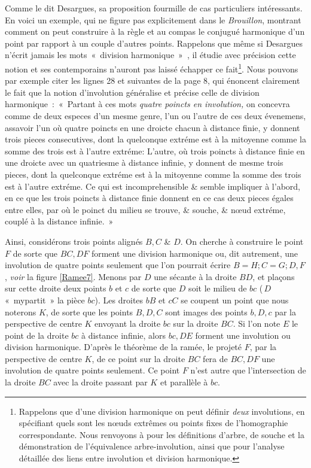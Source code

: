 \documentclass[12pt, a4paper]{article}
\begin{document}
Comme le dit Desargues, sa proposition fourmille de cas particuliers intéressants. En voici un exemple, qui ne figure pas explicitement dans le \textit{Brouillon}, montrant comment on peut construire à la règle et au compas le conjugué harmonique d'un point par rapport à un couple d'autres points. Rappelons que même si Desargues n'écrit jamais les mots~«~division harmonique~»~, il étudie avec précision cette notion et ses contemporains n'auront pas laissé échapper ce fait\footnote{Rappelons que d'une division harmonique on peut définir \textit{deux} involutions, en spécifiant quels sont les n{\oe}uds extrêmes ou points fixes de l'homographie correspondante. Nous renvoyons à \cite{anglade-briend-1} pour les définitions d'arbre, de souche et la démonstration de l'équivalence arbre-involution, ainsi que pour l'analyse détaillée des liens entre involution et division harmonique.}. Nous pouvons par exemple citer les lignes 28 et suivantes de la page 8, qui énoncent clairement le fait que la notion d'involution généralise et précise celle de division harmonique~:~«~Partant à ces mots {\it quatre poincts en involution,} on concevra comme de deux especes d'un mesme genre, l'un ou l'autre de ces deux évenemens, assavoir l'un où quatre poincts en une droicte chacun à distance finie, y donnent trois pieces consecutives, dont la quelconque extréme est à la mitoyenne comme la somme des trois est à l'autre extréme: L'autre, où trois poincts à distance finie en une droicte avec un quatriesme à distance infinie, y donnent de mesme trois pieces, dont la quelconque extréme est à la mitoyenne comme la somme des trois est à l'autre extréme. Ce qui est incomprehensible \& semble impliquer à l'abord, en ce que les trois poincts à distance finie donnent en ce cas deux pieces égales entre elles, par où le poinct du milieu se trouve, \& souche, \& n{\oe}ud extréme, couplé à la distance infinie.~»

Ainsi, considérons trois points alignés $B,C$ \& $D$. On cherche à construire le point $F$ de sorte que $BC, DF$ forment une division harmonique ou, dit autrement, une involution de quatre points seulement que l'on pourrait écrire $B=H;C=G;D,F$, \textit{voir} la figure \ref{Ramee7}. Menons par $D$ une sécante à la droite $BD$, et plaçons sur cette droite deux points $b$ et $c$ de sorte que $D$ soit le milieu de $bc$ (\,$D$ «~mypartit~» la pièce $bc$). Les droites $bB$ et $cC$ se coupent un point que nous noterons $K$, de sorte que les points $B,D,C$ sont images des points $b,D,c$ par la perspective de centre $K$ envoyant la droite $bc$ sur la droite $BC$. Si l'on note $E$ le point de la droite $bc$ à distance infinie, alors $bc, DE$ forment une involution ou division harmonique. D'après le théorème de la ramée, le projeté $F$, par la perspective de centre $K$,  de ce point sur la droite $BC$  fera de $BC, DF$ une involution de quatre points seulement. Ce point $F$ n'est autre que l'intersection de la droite $BC$ avec la droite passant par $K$ et parallèle à $bc$. 
\end{document}
